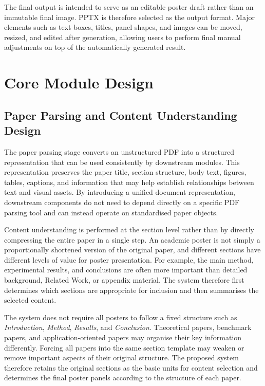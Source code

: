 \documentclass[12pt,oneside]{report}
\begin{document}
\vspace{1em}

The final output is intended to serve as an editable poster draft rather than an immutable final image. PPTX is therefore selected as the output format. Major elements such as text boxes, titles, panel shapes, and images can be moved, resized, and edited after generation, allowing users to perform final manual adjustments on top of the automatically generated result.

\section{Core Module Design}

\subsection{Paper Parsing and Content Understanding Design}

The paper parsing stage converts an unstructured PDF into a structured representation that can be used consistently by downstream modules. This representation preserves the paper title, section structure, body text, figures, tables, captions, and information that may help establish relationships between text and visual assets. By introducing a unified document representation, downstream components do not need to depend directly on a specific PDF parsing tool and can instead operate on standardised paper objects.

\vspace{1em}

Content understanding is performed at the section level rather than by directly compressing the entire paper in a single step. An academic poster is not simply a proportionally shortened version of the original paper, and different sections have different levels of value for poster presentation. For example, the main method, experimental results, and conclusions are often more important than detailed background, Related Work, or appendix material. The system therefore first determines which sections are appropriate for inclusion and then summarises the selected content.

\vspace{1em}

The system does not require all posters to follow a fixed structure such as \textit{Introduction}, \textit{Method}, \textit{Results}, and \textit{Conclusion}. Theoretical papers, benchmark papers, and application-oriented papers may organise their key information differently. Forcing all papers into the same section template may weaken or remove important aspects of their original structure. The proposed system therefore retains the original sections as the basic units for content selection and determines the final poster panels according to the structure of each paper.
\end{document}
